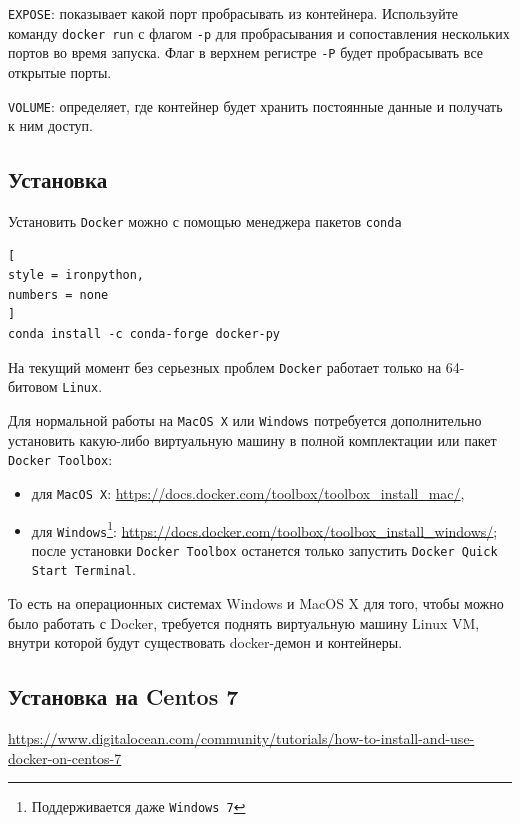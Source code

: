 \documentclass[%
	11pt,
	a4paper,
	utf8,
		]{article}
\begin{document}
\texttt{EXPOSE}: показывает какой порт пробрасывать из контейнера. Используйте команду \texttt{docker run} с флагом \verb|-p| для пробрасывания и сопоставления нескольких портов во время запуска. Флаг в верхнем регистре \verb|-P| будет пробрасывать все открытые порты.

\texttt{VOLUME}: определяет, где контейнер будет хранить постоянные данные и получать к ним доступ.

\subsection{Установка}

Установить \texttt{Docker} можно с помощью менеджера пакетов \texttt{conda}

\begin{lstlisting}[
style = ironpython,
numbers = none
]
conda install -c conda-forge docker-py
\end{lstlisting}

На текущий момент без серьезных проблем \texttt{Docker} работает только на 64-битовом \texttt{Linux}.

Для нормальной работы на \texttt{MacOS X} или \texttt{Windows} потребуется дополнительно установить какую-либо виртуальную машину в полной комплектации или пакет \texttt{Docker Toolbox}:

\begin{itemize}
	\item для \texttt{MacOS X}: \url{https://docs.docker.com/toolbox/toolbox_install_mac/},
	
	\item для \texttt{Windows}\footnote{Поддерживается даже \texttt{Windows 7}}: \url{https://docs.docker.com/toolbox/toolbox_install_windows/}; после установки \texttt{Docker Toolbox} останется только запустить \texttt{Docker Quick Start Terminal}.
\end{itemize}

То есть на операционных системах Windows и MacOS X для того, чтобы можно было работать с Docker, требуется поднять виртуальную машину Linux VM, внутри которой будут существовать docker-демон и контейнеры.

\subsection{Установка на Centos 7}

\url{https://www.digitalocean.com/community/tutorials/how-to-install-and-use-docker-on-centos-7}
\end{document}
